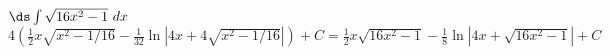 {$\ds \int \sqrt{16x^2-1}\ dx$
}
{$4\left(\frac12x\sqrt{x^2-1/16}-\frac1{32}\ln|4x+4\sqrt{x^2-1/16}|\right)+C = \frac12x\sqrt{16x^2-1}-\frac18\ln|4x+\sqrt{16x^2-1}|+C$
}